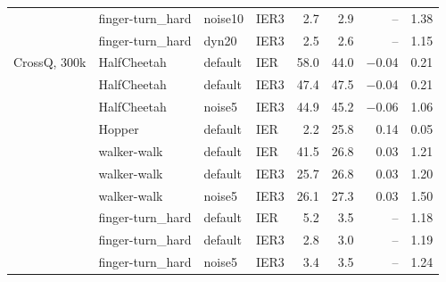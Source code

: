 \begin{tabular}{llllrrrr}
 & finger-turn\_hard & noise10 & IER3 & 2.7 & 2.9 & -- & 1.38 \\
 & finger-turn\_hard & dyn20 & IER3 & 2.5 & 2.6 & -- & 1.15 \\
\midrule
CrossQ, 300k & HalfCheetah & default & IER & 58.0 & 44.0 & $-$0.04 & 0.21 \\
 & HalfCheetah & default & IER3 & 47.4 & 47.5 & $-$0.04 & 0.21 \\
 & HalfCheetah & noise5 & IER3 & 44.9 & 45.2 & $-$0.06 & 1.06 \\
 & Hopper & default & IER & 2.2 & 25.8 & 0.14 & 0.05 \\
 & walker-walk & default & IER & 41.5 & 26.8 & 0.03 & 1.21 \\
 & walker-walk & default & IER3 & 25.7 & 26.8 & 0.03 & 1.20 \\
 & walker-walk & noise5 & IER3 & 26.1 & 27.3 & 0.03 & 1.50 \\
 & finger-turn\_hard & default & IER & 5.2 & 3.5 & -- & 1.18 \\
 & finger-turn\_hard & default & IER3 & 2.8 & 3.0 & -- & 1.19 \\
 & finger-turn\_hard & noise5 & IER3 & 3.4 & 3.5 & -- & 1.24 \\
\bottomrule
\end{tabular}
